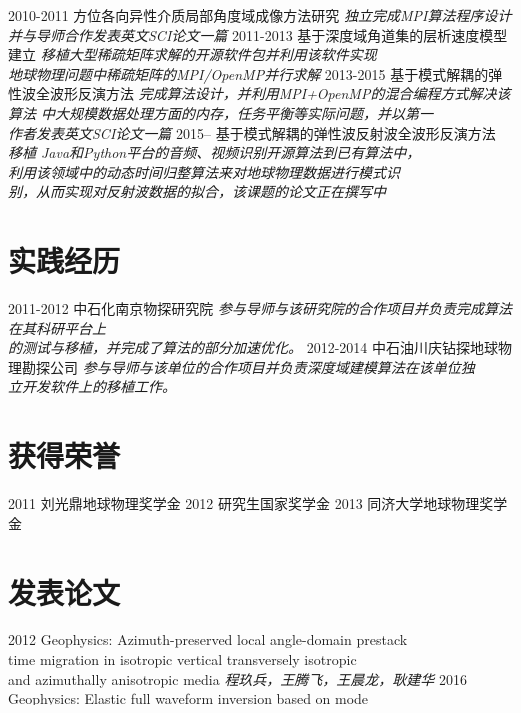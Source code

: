 \documentclass[]{friggeri-cv}
\begin{document}
\begin{entrylist}
  \entry
    {2010-2011}
    {方位各向异性介质局部角度域成像方法研究}
	{\emph{独立完成MPI算法程序设计并与导师合作发表英文SCI论文一篇}}
  \entry
    {2011-2013}
    {基于深度域角道集的层析速度模型建立}
    {\emph{移植大型稀疏矩阵求解的开源软件包并利用该软件实现\\
	地球物理问题中稀疏矩阵的MPI/OpenMP并行求解}}
  \entry
    {2013-2015}
    {基于模式解耦的弹性波全波形反演方法}
    {\emph{
		完成算法设计，并利用MPI+OpenMP的混合编程方式解决该算法
		中大规模数据处理方面的内存，任务平衡等实际问题，并以第一\\
		作者发表英文SCI论文一篇
	}}
  \entry
    {2015--}
    {基于模式解耦的弹性波反射波全波形反演方法}
	{\emph{
		移植 Java和Python平台的音频、视频识别开源算法到已有算法中，\\
		利用该领域中的动态时间归整算法来对地球物理数据进行模式识\\
		别，从而实现对反射波数据的拟合，该课题的论文正在撰写中
	}}
\end{entrylist}

\section{实践经历}
\begin{entrylist}
  \entry
    {2011-2012}
    {中石化南京物探研究院}
	{\emph{
		参与导师与该研究院的合作项目并负责完成算法在其科研平台上\\
		的测试与移植，并完成了算法的部分加速优化。
	}}
  \entry
    {2012-2014}
    {中石油川庆钻探地球物理勘探公司}
	{\emph{
		参与导师与该单位的合作项目并负责深度域建模算法在该单位独\\
		立开发软件上的移植工作。
	}}
\end{entrylist}
\section{获得荣誉}
\begin{entrylist}
  \entryTwo
    {2011}
    {刘光鼎地球物理奖学金}
  \entryTwo
    {2012}
	{研究生国家奖学金}
  \entryTwo
    {2013}
    {同济大学地球物理奖学金}
\par\vspace{\parskip}
\end{entrylist}

\section{发表论文}
\begin{entrylist}
  \entry
    {2012}
	{Geophysics: Azimuth-preserved local angle-domain prestack \\
	time migration in isotropic	vertical transversely isotropic\\
	and azimuthally anisotropic media}
	{\emph{程玖兵，王腾飞，王晨龙，耿建华}}
  \entry
    {2016}
	{Geophysics: Elastic full waveform inversion based on mode\\
		decomposition: The approach and	mechanism
	}
	{\emph{王腾飞，程玖兵（审稿中）}}
\end{entrylist}
\end{document}
